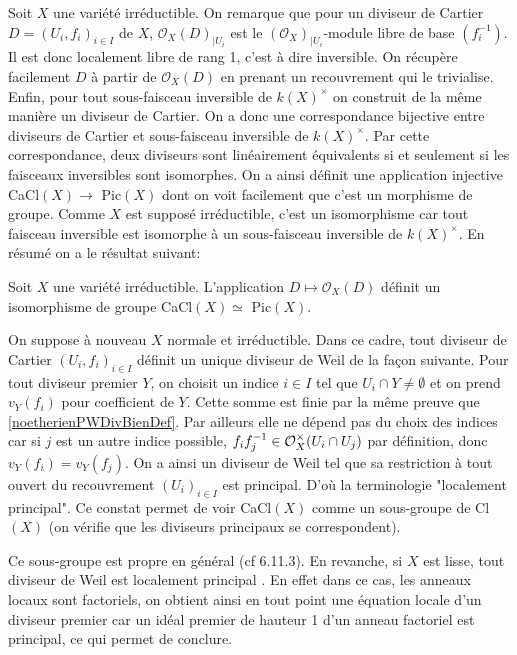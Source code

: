Soit $X$ une variété irréductible. On remarque que pour un diviseur de Cartier $D=(U_i, f_i)_{i\in I}$ de $X$, $\mathcal{O}_X(D)_{|U_i}$ est le $(\mathcal{O}_X)_{|U_i}$-module libre de base $(f_i^{-1})$. Il est donc localement libre de rang 1, c'est à dire inversible. On récupère facilement $D$ à partir de $\mathcal{O}_X(D)$ en prenant un recouvrement qui le trivialise. Enfin, pour tout sous-faisceau inversible de $k(X)^\times$ on construit de la même manière un diviseur de Cartier. On a donc une correspondance bijective entre diviseurs de Cartier et sous-faisceau inversible de $k(X)^\times$. Par cette correspondance, deux diviseurs sont linéairement équivalents si et seulement si les faisceaux inversibles sont isomorphes. On a ainsi définit une application injective CaCl$(X)\rightarrow$ Pic$(X)$ dont on voit facilement que c'est un morphisme de groupe. Comme $X$ est supposé irréductible, c'est un isomorphisme car tout faisceau inversible est isomorphe à un sous-faisceau inversible de $k(X)^\times$. En résumé on a le résultat suivant:


\begin{prop}\label{isopic}
Soit $X$ une variété irréductible. L'application $D\mapsto \mathcal{O}_X(D)$ définit un isomorphisme de groupe CaCl$(X)\simeq $ Pic$(X)$.
\end{prop}


On suppose à nouveau $X$ normale et irréductible. Dans ce cadre, tout diviseur de Cartier $(U_i, f_i)_{i\in I}$ définit un unique diviseur de Weil de la façon suivante. Pour tout diviseur premier $Y$, on choisit un indice $i\in I$ tel que $U_i\cap Y\neq \emptyset$ et on prend $v_Y(f_i)$ pour coefficient de $Y$. Cette somme est finie par la même preuve que \ref{noetherienPWDivBienDef}. Par ailleurs elle ne dépend pas du choix des indices car si $j$ est un autre indice possible, $f_if_j^{-1}\in \mathcal{O}_X^\times(U_i\cap U_j)$ par définition, donc $v_Y(f_i)=v_Y(f_j)$. On a ainsi un diviseur de Weil tel que sa restriction à tout ouvert du recouvrement $(U_i)_{i\in I}$ est principal. D'où la terminologie "localement principal". Ce constat permet de voir CaCl$(X)$ comme un sous-groupe de Cl$(X)$ (on vérifie que les diviseurs principaux se correspondent).

Ce sous-groupe est propre en général (cf \cite{Hartshorne} 6.11.3). En revanche, si $X$ est lisse, tout diviseur de Weil est localement principal . En effet dans ce cas, les anneaux locaux sont factoriels, on obtient ainsi en tout point une équation locale d'un diviseur premier car un idéal premier de hauteur 1 d'un anneau factoriel est principal, ce qui permet de conclure.\\

